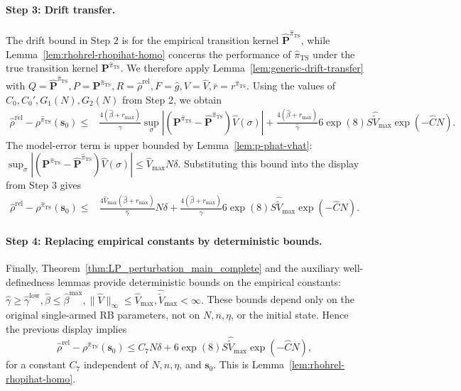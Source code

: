 \documentclass[mnsc,nonblindrev]{informs3}
\newcommand{\bp}{\bm{P}}
\newcommand{\bphat}{\widehat{\bm{P}}}
\newcommand{\pihts}{\widehat{\pi}_{\mathrm{TS}}}
\newcommand{\bms}{\bm{s}}
\begin{document}
\paragraph{Step 3: Drift transfer.}
The drift bound in Step 2 is for the empirical transition kernel
\(\bphat^{\pihts}\), while Lemma~\ref{lem:rhohrel-rhopihat-homo} concerns
the performance of \(\pihts\) under the true transition kernel
\(\bp^{\pihts}\). We therefore apply
Lemma~\ref{lem:generic-drift-transfer} with
\(
    Q=\bphat^{\pihts},
    P=\bp^{\pihts},
    R=\widehat\rho^{\mathrm{rel}},
    F=\widehat g,
    V=\widehat V,
    \bar r=r^{\pihts}.
\)
Using the values of \(C_0,C_0',G_1(N),G_2(N)\) from Step 2, we obtain
\[
\begin{aligned}
    \widehat\rho^{\mathrm{rel}}
    -
    \rho^{\pihts}(\bms_0)
    \le&
    \frac{4(\widehat\beta+r_{\max})}{\widehat\gamma}
    \sup_{\sigma}
    \left|
    (\bp^{\pihts}-\bphat^{\pihts})
    \widehat V(\sigma)
    \right|  +
    \frac{4(\widehat\beta+r_{\max})}{\widehat\gamma}
    6\exp(8)S\widehat{\widetilde V}_{\max}
    \exp(-\widehat C N).
\end{aligned}
\]
The model-error term is upper bounded by Lemma~\ref{lem:p-phat-vhat}:
\(
    \sup_{\sigma}
    \left|
    (\bp^{\pihts}-\bphat^{\pihts})
    \widehat V(\sigma)
    \right|
    \le
    \widehat V_{\max}N\delta.
\)
Substituting this bound into the display from Step 3 gives
\[
\begin{aligned}
    \widehat\rho^{\mathrm{rel}}
    -
    \rho^{\pihts}(\bms_0)
    \le&
    \frac{4\widehat V_{\max}(\widehat\beta+r_{\max})}
    {\widehat\gamma}
    N\delta  +
    \frac{4(\widehat\beta+r_{\max})}{\widehat\gamma}
    6\exp(8)S\widehat{\widetilde V}_{\max}
    \exp(-\widehat C N).
\end{aligned}
\]

\paragraph{Step 4: Replacing empirical constants by deterministic bounds.}
Finally, Theorem~\ref{thm:LP_perturbation_main_complete} and the auxiliary well-definedness
lemmas provide deterministic bounds on the empirical constants:
\(
    \widehat\gamma\ge \widehat\gamma^{\mathrm{low}},
    \widehat\beta\le \widehat\beta^{\max},
    \|\widehat V\|_\infty\le \widehat V_{\max},
    \widehat{\widetilde V}_{\max}<\infty.
\)
These bounds depend only on the original single-armed RB parameters, not on
\(N,n,\eta\), or the initial state. Hence the previous display implies
\[
    \widehat\rho^{\mathrm{rel}}
    -
    \rho^{\pihts}(\bms_0)
    \le
    C_7N\delta
    +
    6\exp(8)S\widehat{\widetilde V}_{\max}
    \exp(-\widehat C N),
\]
for a constant \(C_7\) independent of \(N,n,\eta\), and \(\bms_0\). This
is Lemma~\ref{lem:rhohrel-rhopihat-homo}.
\end{document}
